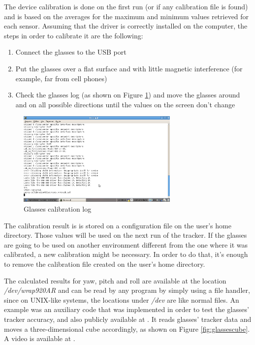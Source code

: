 \documentclass[msc, a4paper, classic, en]{ufbathesis}
\begin{document}
The device calibration is done on the first run (or if any calibration file is found) and is based on the averages for the maximum and minimum values retrieved for each sensor. Assuming that the driver is correctly installed on the computer, the steps in order to calibrate it are the following:

\begin{enumerate}
  \item Connect the glasses to the USB port
  \item Put the glasses over a flat surface and with little magnetic interference (for example, far from cell phones)
  \item Check the glasses log (as shown on Figure \ref{fig:glasseslog}) and move the glasses around and on all possible directions until the values on the screen don't change
\end{enumerate}

\begin{figure}
\centering
\includegraphics[width=0.7\textwidth]{images/glasseslog.png}
\caption{Glasses calibration log}
\label{fig:glasseslog}
\end{figure}

The calibration result is is stored on a configuration file on the user's home directory. Those values will be used on the next run of the tracker. If the glasses are going to be used on another environment different from the one where it was calibrated, a new calibration might be necessary. In order to do that, it's enough to remove the calibration file created on the user's home directory.

The calculated results for yaw, pitch and roll are available at the location \textit{/dev/wrap920AR} and can be read by any program by simply using a file handler, since on UNIX-like systems, the locations under \textit{/dev} are like normal files. An example was an auxiliary code that was implemented in order to test the glasses' tracker accuracy, and also publicly available at \cite{masterproject}. It reads glasses' tracker data and moves a three-dimensional cube accordingly, as shown on Figure \ref{fig:glassescube}. A video is available at \cite{videos}.
\end{document}

